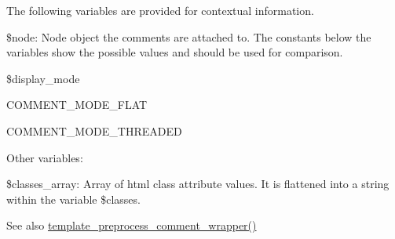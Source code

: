 The following variables are provided for contextual information.
\begin{DoxyItemize}
\item \$node: Node object the comments are attached to. The constants below the variables show the possible values and should be used for comparison.
\item \$display\_\-mode
\begin{DoxyItemize}
\item COMMENT\_\-MODE\_\-FLAT
\item COMMENT\_\-MODE\_\-THREADED
\end{DoxyItemize}
\end{DoxyItemize}

Other variables:
\begin{DoxyItemize}
\item \$classes\_\-array: Array of html class attribute values. It is flattened into a string within the variable \$classes.
\end{DoxyItemize}

\begin{DoxySeeAlso}{See also}
\hyperlink{comment_8module_aeccd0447ccb1d7a888c63c47444d54fc}{template\_\-preprocess\_\-comment\_\-wrapper()} 
\end{DoxySeeAlso}
